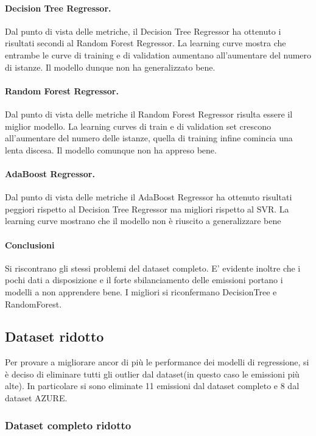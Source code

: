 \paragraph{\textbf{Decision Tree Regressor}.}
Dal punto di vista delle metriche, il Decision Tree Regressor ha ottenuto i risultati secondi al Random Forest Regressor. 
La learning curve mostra che entrambe le curve di training e di validation aumentano all'aumentare del numero di istanze. Il modello dunque non ha generalizzato bene.
\paragraph{\textbf{Random Forest Regressor}.}
Dal punto di vista delle metriche il Random Forest Regressor risulta essere il miglior modello.
La learning curves di train e di validation set crescono all'aumentare del numero delle istanze, quella di training infine comincia una lenta discesa. Il modello comunque non ha appreso bene.
\paragraph{\textbf{AdaBoost Regressor}.}
Dal punto di vista delle metriche il AdaBoost Regressor ha ottenuto risultati peggiori rispetto al Decision Tree Regressor ma migliori rispetto al SVR.
La learning curve mostrano che il modello non è riuscito a generalizzare bene

\paragraph{\textbf{Conclusioni}} Si riscontrano gli stessi problemi del dataset completo. E' evidente inoltre che i pochi dati a disposizione e il forte sbilanciamento delle emissioni portano i modelli a non apprendere bene. I migliori si riconfermano DecisionTree e RandomForest.
\newpage

\subsection{Dataset ridotto}

Per provare a migliorare ancor di più le performance dei modelli di regressione, si è deciso di eliminare tutti gli outlier dal dataset(in questo caso le emissioni più alte). In particolare si sono eliminate 11 emissioni dal dataset completo e 8 dal dataset AZURE.

\subsubsection{Dataset completo ridotto}

